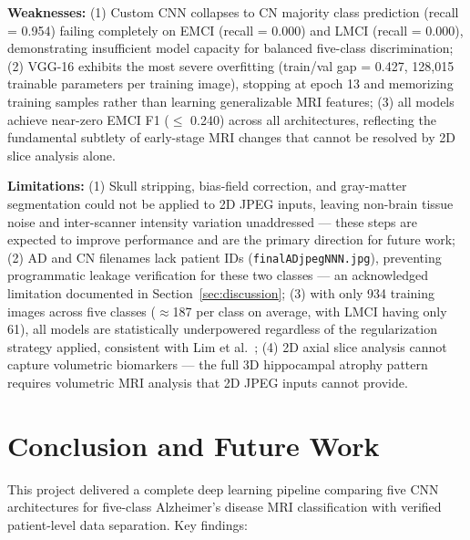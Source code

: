 \documentclass[12pt, a4paper]{article}
\begin{document}
\textbf{Weaknesses:}
(1) Custom CNN collapses to CN majority class
prediction (recall = 0.954) failing completely on
EMCI (recall = 0.000) and LMCI (recall = 0.000),
demonstrating insufficient model capacity for
balanced five-class discrimination;
(2) VGG-16 exhibits the most severe overfitting
(train/val gap = 0.427, 128,015 trainable
parameters per training image), stopping at epoch
13 and memorizing training samples rather than
learning generalizable MRI features;
(3) all models achieve near-zero EMCI F1
($\leq$ 0.240) across all architectures, reflecting
the fundamental subtlety of early-stage MRI
changes that cannot be resolved by 2D slice
analysis alone.

\textbf{Limitations:}
(1) Skull stripping, bias-field correction, and
gray-matter segmentation \cite{lim2022} could not
be applied to 2D JPEG inputs, leaving non-brain
tissue noise and inter-scanner intensity variation
unaddressed --- these steps are expected to improve
performance and are the primary direction for
future work;
(2) AD and CN filenames lack patient IDs
(\texttt{finalADjpegNNN.jpg}), preventing
programmatic leakage verification for these two
classes --- an acknowledged limitation documented
in Section~\ref{sec:discussion};
(3) with only 934 training images across five
classes ($\approx$187 per class on average, with
LMCI having only 61), all models are statistically
underpowered regardless of the regularization
strategy applied, consistent with Lim et al.\
\cite{lim2022};
(4) 2D axial slice analysis cannot capture
volumetric biomarkers --- the full 3D hippocampal
atrophy pattern requires volumetric MRI analysis
that 2D JPEG inputs cannot provide.

\section{Conclusion and Future Work}
\label{sec:conclusion}

This project delivered a complete deep learning pipeline
comparing five CNN architectures for five-class
Alzheimer's disease MRI classification with verified
patient-level data separation. Key findings:
\end{document}
